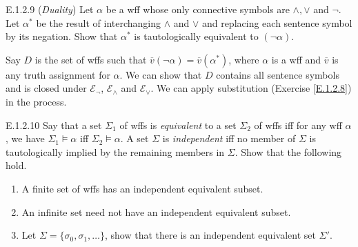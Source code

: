 \begin{exercise}{E.1.2.9}
  (\textit{Duality}) Let $\alpha$ be a wff whose only connective symbols are $\wedge,\vee$ and $\neg$. Let $\alpha^*$ be the result of interchanging $\wedge$ and $\vee$ and replacing each sentence symbol by its negation. Show that $\alpha^*$ is tautologically equivalent to $(\neg \alpha)$.
\end{exercise}

Say $D$ is the set of wffs such that $\overline{v}(\neg\alpha)=\overline{v}(\alpha^*)$, where $\alpha$ is a wff and $\overline{v}$ is any truth assignment for $\alpha$. We can show that $D$ contains all sentence symbols and is closed under $\mathcal E_\neg$, $\mathcal{E}_\wedge$ and $\mathcal{E}_\vee$. We can apply substitution (Exercise \ref{E.1.2.8}) in the process.

\begin{exercise}{E.1.2.10}
  Say that a set $\Sigma_1$ of wffs is \textit{equivalent} to a set $\Sigma_2$ of wffs iff for any wff $\alpha$, we have $\Sigma_1\vDash \alpha$ iff $\Sigma_2\vDash \alpha$. A set $\Sigma$ is \textit{independent} iff no member of $\Sigma$ is tautologically implied by the remaining members in $\Sigma$. Show that the following hold.\begin{enumerate}[label=(\alph*)]
    \item A finite set of wffs has an independent equivalent subset.
    \item An infinite set need not have an independent equivalent subset.
    \item Let $\Sigma=\{\sigma_0,\sigma_1,\dots\}$, show that there is an independent equivalent set $\Sigma'$.\qedhere
  \end{enumerate}
\end{exercise}


